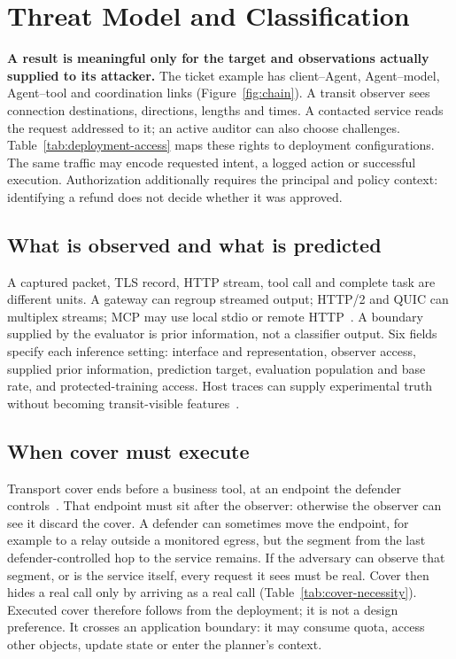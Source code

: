 \section{Threat Model and Classification}\label{sec:taxonomy}
\textbf{A result is meaningful only for the target and observations actually supplied to its attacker.}
The ticket example has client--Agent, Agent--model, Agent--tool and coordination links (Figure~\ref{fig:chain}). A transit observer sees connection destinations, directions, lengths and times. A contacted service reads the request addressed to it; an active auditor can also choose challenges. Table~\ref{tab:deployment-access} maps these rights to deployment configurations. The same traffic may encode requested intent, a logged action or successful execution. Authorization additionally requires the principal and policy context: identifying a refund does not decide whether it was approved.



\subsection{What is observed and what is predicted}
A captured packet, TLS record, HTTP stream, tool call and complete task are different units. A gateway can regroup streamed output; HTTP/2 and QUIC can multiplex streams; MCP may use local stdio or remote HTTP~\cite{mcp2025transports,rfc9113,rfc9114,rfc9000,rfc8446}. A boundary supplied by the evaluator is prior information, not a classifier output. Six fields specify each inference setting: interface and representation, observer access, supplied prior information, prediction target, evaluation population and base rate, and protected-training access. Host traces can supply experimental truth without becoming transit-visible features~\cite{reynolds2006wap5,tak2009vpath}.

\subsection{When cover must execute}\label{sec:necessity}
Transport cover ends before a business tool, at an endpoint the defender controls~\cite{apthorpe2019stp}. That endpoint must sit after the observer: otherwise the observer can see it discard the cover. A defender can sometimes move the endpoint, for example to a relay outside a monitored egress, but the segment from the last defender-controlled hop to the service remains. If the adversary can observe that segment, or is the service itself, every request it sees must be real. Cover then hides a real call only by arriving as a real call (Table~\ref{tab:cover-necessity}). Executed cover therefore follows from the deployment; it is not a design preference. It crosses an application boundary: it may consume quota, access other objects, update state or enter the planner's context.


